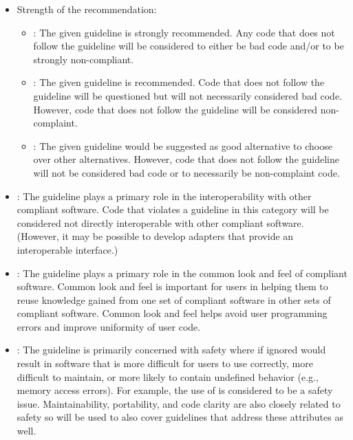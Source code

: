 \begin{itemize}

{}\item Strength of the recommendation:

  \begin{itemize}

  {}\item\textbf{\StrongRecGC}: The given guideline is strongly
  recommended.  Any code that does not follow the guideline will be
  considered to either be bad code and/or to be strongly
  non-compliant.

  {}\item\textbf{\RecGC}: The given guideline is recommended.  Code
  that does not follow the guideline will be questioned but will not
  necessarily considered bad code.  However, code that does not follow
  the guideline will be considered non-complaint.

  {}\item\textbf{\SuggestGC}: The given guideline would be suggested
  as good alternative to choose over other alternatives.  However, code
  that does not follow the guideline will not be considered bad code
  or to necessarily be non-complaint code.

   \end{itemize}

{}\item\textbf{\InteropGC}: The guideline plays a primary role in the
interoperability with other compliant software.  Code that violates a
{}\StrongRecGC{} guideline in this category will be considered not
directly interoperable with other compliant software.  (However, it
may be possible to develop adapters that provide an interoperable 
interface.)

{}\item\textbf{\ComLookFeelGC}: The guideline plays a primary role in
the common look and feel of compliant software.  Common look and feel
is important for users in helping them to reuse knowledge gained from
one set of compliant software in other sets of compliant software.
Common look and feel helps avoid user programming errors and improve
uniformity of user code.

{}\item\textbf{\SafetyGC}: The guideline is primarily concerned with
safety where if ignored would result in software that is more
difficult for users to use correctly, more difficult to maintain, or
more likely to contain undefined behavior (e.g., memory access
errors).  For example, the use of {} is considered to be a
safety issue.  Maintainability, portability, and code clarity are also
closely related to safety so {}\SafetyGC{} will be used to also cover
guidelines that address these attributes as well.


\end{itemize}
